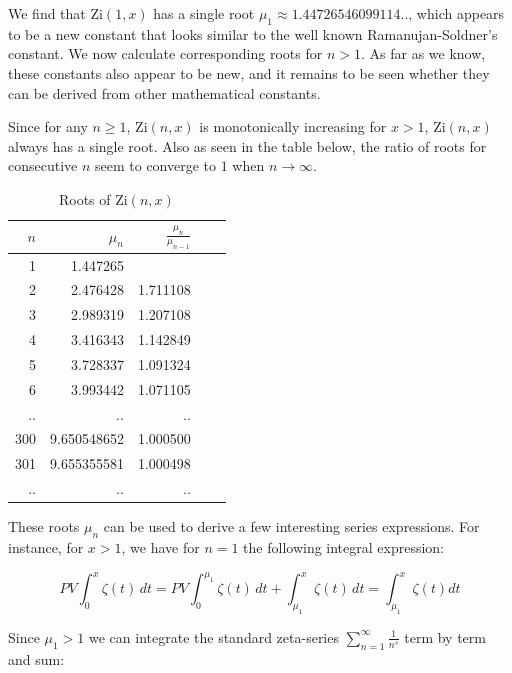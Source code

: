 \documentclass[a4paper,11pt,twoside]{amsart}
\newcommand\Zi{\mathrm{Zi}}
\begin{document}
We find that $\Zi(1,x)$ has a single root $\mu_1 \approx 1.44726546099114$.., which appears to be a new constant that looks similar to the well known Ramanujan-Soldner's constant. We now calculate corresponding roots for $n>1$. As far as we know, these constants also appear to be new, and it remains to be seen whether they can be derived from other mathematical constants. 

Since for any $n \ge 1$, $\Zi(n,x)$ is monotonically increasing for $x>1$, $\Zi(n,x)$ always has a single root. Also as seen in the table below, the ratio of roots for consecutive $n$ seem to converge to $1$ when $n \rightarrow \infty$. 

\begin{table}[H]
  \begin{center}
    \caption{Roots of $\Zi(n,x)$}
    \label{tab:table2}
    \begin{tabular}{r|r|r|r|r} %
      $n$ & $\mu_{n}$ & $\frac{\mu_{n}}{\mu_{n-1}}$\\
      \hline
      1 & 1.447265 & \\
      2 & 2.476428 & 1.711108\\
      3 & 2.989319 & 1.207108\\
      4 & 3.416343 & 1.142849\\
      5 & 3.728337 & 1.091324\\
      6 & 3.993442 & 1.071105\\
      .. & .. & ..\\
      300 & 9.650548652 & 1.000500\\
      301 & 9.655355581 & 1.000498\\
      .. & .. & ..\\
    \end{tabular}
  \end{center}
\end{table}

These roots $\mu_{n}$ can be used to derive a few interesting series expressions. For instance, for $x > 1$, we have for $n = 1$ the following integral expression:

\begin{equation}\label{zetPV1}
 PV \int_0^x \zeta(t)\, dt = PV \int_0^{\mu_1} \zeta(t)\, dt + \int_{\mu_1}^{x} \zeta(t)\, dt = \int_{\mu_1}^{x} \zeta(t) dt
\end{equation}

Since $\mu_1 > 1$ we can integrate the standard zeta-series $\displaystyle \sum_{n=1}^{\infty} \frac{1}{n^s}$ term by term and sum:
\end{document}
